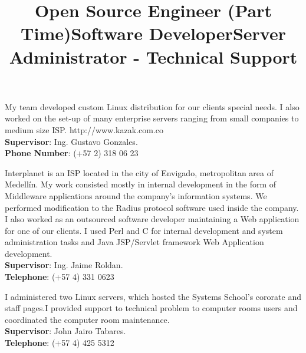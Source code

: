 \begin{resume}
\title{\textbf{Open Source Engineer} (Part Time)}
\begin{position}
My team developed custom  Linux distribution for our clients
special needs. I also worked on  the set-up of many enterprise
servers ranging from small companies to medium size ISP. http://www.kazak.com.co\\
\textbf{Supervisor}:  Ing. Gustavo Gonzales.\\
\textbf{Phone Number}:  (+57 2) 318 06 23 
\end{position}
 \newline
 \newline
 \newline
 \newline
 \newline
 \newline



\title{\textbf{Software Developer}}
\begin{position}
Interplanet is an  ISP located in the city of Envigado, metropolitan area of Medell\'{i}n.
My work consisted mostly  in internal development in the form of
Middleware applications  around the company's information systems.
We performed modification to the Radius protocol software used inside the company.
I also worked as an outsourced software developer maintaining a Web application for one of our clients.  I used Perl and C for internal development and  system administration tasks and Java JSP/Servlet framework Web
Application development.\\
\textbf{Supervisor}:  Ing. Jaime Roldan.\\
\textbf{Telephone}:  (+57 4) 331 0623 
\end{position}
\newline

\title{\textbf{Server Administrator - Technical Support}}
\begin{position}
I administered two Linux servers, which hosted the Systems School's
cororate and staff pages.I provided support to technical problem 
to computer rooms users and coordinated the computer room maintenance.\\
\textbf{Supervisor}:  John Jairo Tabares.\\
\textbf{Telephone}:  (+57 4) 425 5312 
\end{position}
\newline



\end{resume}
